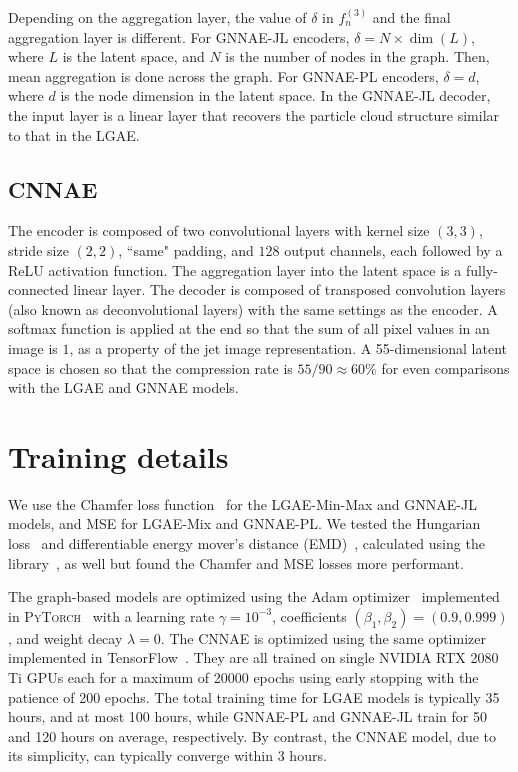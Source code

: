 Depending on the aggregation layer, the value of $\delta$ in $f_n^{(3)}$ and the final aggregation layer is different.
For GNNAE-JL encoders, $\delta = N \times \dim(L)$, where $L$ is the latent space, and $N$ is the number of nodes in the graph.
Then, mean aggregation is done across the graph.
For GNNAE-PL encoders, $\delta = d$, where $d$ is the node dimension in the latent space.
In the GNNAE-JL decoder, the input layer is a linear layer that recovers the particle cloud structure similar to that in the LGAE.

\subsection{CNNAE}
The encoder is composed of two convolutional layers with kernel size $(3, 3)$, stride size $(2, 2)$, ``same" padding, and $128$ output channels, each followed by a ReLU activation function.
The aggregation layer into the latent space is a fully-connected linear layer.
The decoder is composed of transposed convolution layers (also known as deconvolutional layers) with the same settings as the encoder.
A softmax function is applied at the end so that the sum of all pixel values in an image is $1$, as a property of the jet image representation.
A 55-dimensional latent space  is chosen so that the compression rate is $55/90 \approx 60\%$ for even comparisons with the LGAE and GNNAE models.



\section{Training details}
\label{app:06_lgae_training}
We use the Chamfer loss function~\cite{10.5555/1622943.1622971,Fan_2017_CVPR,Zhang2020FSPool} for the LGAE-Min-Max and GNNAE-JL models, and  MSE for LGAE-Mix and GNNAE-PL.
We tested the Hungarian loss~\cite{hungarian,2020SciPy-NMeth} and differentiable energy mover's distance (EMD)~\cite{Komiske:2019fks}, calculated using the \jetnet library~\cite{jetnetlibrary}, as well but found the Chamfer and MSE losses more performant.

The graph-based models are optimized using the Adam optimizer~\cite{kigma2015adam}
implemented in \textsc{PyTorch}~\cite{pytorch}
with a learning rate $\gamma = 10^{-3}$, coefficients $(\beta_1, \beta_2) = (0.9, 0.999)$, and weight decay $\lambda = 0$.
The CNNAE is optimized using the same optimizer implemented in TensorFlow~\cite{tensorflow2015-whitepaper}.
They are all trained on single NVIDIA RTX 2080 Ti GPUs each for a maximum of 20000 epochs using early stopping with the patience of 200 epochs.
The total training time for LGAE models is typically 35 hours, and at most 100 hours, while GNNAE-PL and GNNAE-JL train for 50 and 120 hours on average, respectively.
By contrast, the CNNAE model, due to its simplicity, can typically converge within 3 hours.



